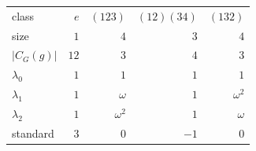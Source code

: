 \begin{tabular}{lrrrr}
\toprule
class & $e$ & $(123)$ & $(12)(34)$ & $(132)$ \\
size & $1$ & $4$ & $3$ & $4$ \\
$|C_G(g)|$ & $12$ & $3$ & $4$ & $3$ \\
\midrule
$\lambda_0$ & $1$ & $1$ & $1$ & $1$ \\
$\lambda_1$ & $1$ & $\omega$ & $1$ & $\omega^2$ \\
$\lambda_2$ & $1$ & $\omega^2$ & $1$ & $\omega$ \\
standard & $3$ & $0$ & $-1$ & $0$ \\
\bottomrule
\end{tabular}
